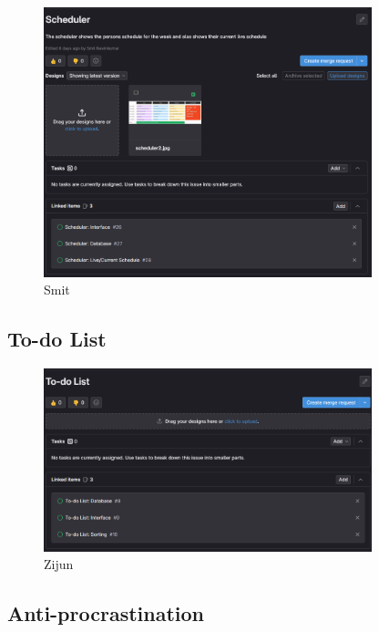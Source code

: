 \documentclass[a4paper]{article}
\begin{document}
\begin{figure}[H] %
	\centering %
	\includegraphics[width=0.85\textwidth]{./images/S2_Scheduler.png}
	\caption*{Smit} %
	\label{Fig.S2_Scheduler} %
\end{figure}

\subsection{To-do List}

\begin{figure}[H] %
	\centering %
	\includegraphics[width=0.85\textwidth]{./images/S2_To-do_List.png}
	\caption*{Zijun} %
	\label{Fig.S2_todo} %
\end{figure}

\subsection{Anti-procrastination}
\end{document}
